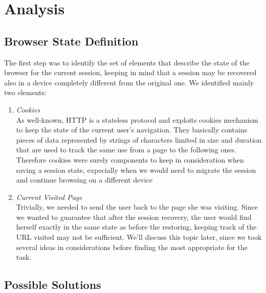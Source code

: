 \documentclass[11pt,a4paper]{article}
\begin{document}
\newpage

\section{Analysis}


\subsection{Browser State Definition}
The first step was to identify the set of elements that describe the state of the browser for the current session, keeping in mind that a session may be recovered also in a device completely different from the original one.
We identified mainly two elements:
\begin{enumerate}
\item \emph{Cookies} \\
	As well-known, HTTP is a stateless protocol and exploits cookies mechanism to keep the state of the current user’s navigation. They basically contains pieces of data represented by strings of characters limited in size and duration that are used to track the same use from a page to the following ones. Therefore cookies were surely components to keep in consideration when saving a session state, expecially when we would need to migrate the session and continue browsing on a different device

\item \emph{Current Visited Page} \\
	Trivially, we needed to send the user back to the page she was visiting. Since we wanted to guarantee that after the session recovery, the user would find herself exactly in the same 	state as before the restoring, keeping track of the URL visited may not be sufficient. We’ll 	discuss this topic later, since we took several ideas in considerations before finding the most appropriate for the task.
\end{enumerate}

\subsection{Possible Solutions}
\end{document}
